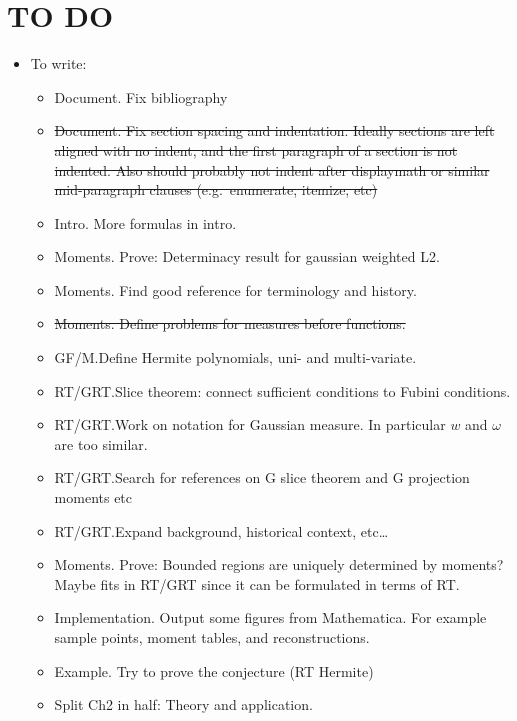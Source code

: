



\section{TO DO}
\begin{itemize}
    \item To write:
    \begin{itemize}
        \item Document. Fix bibliography
        \item \sout{Document. Fix section spacing and indentation. Ideally sections are left aligned with no indent, and the first paragraph of a section is not indented. Also should probably not indent after displaymath or similar mid-paragraph clauses (e.g.\ enumerate, itemize, etc)}
        \item Intro. More formulas in intro.
        \item Moments. Prove: Determinacy result for gaussian weighted L2.
        \item Moments. Find good reference for terminology and history. 
        \item \sout{Moments. Define problems for measures before functions.}
        \item GF/M.\@ Define Hermite polynomials, uni- and multi-variate.
        \item RT/GRT.\@ Slice theorem: connect sufficient conditions to Fubini conditions.
        \item RT/GRT.\@ Work on notation for Gaussian measure. In particular $w$ and $\omega$ are too similar. 
        \item RT/GRT.\@ Search for references on G slice theorem and G projection moments etc
        \item RT/GRT.\@ Expand background, historical context, etc\ldots
        \item Moments. Prove: Bounded regions are uniquely determined by moments? Maybe fits in RT/GRT since it can be formulated in terms of RT.\@
        \item Implementation. Output some figures from Mathematica. For example sample points, moment tables, and reconstructions.
        \item Example. Try to prove the conjecture (RT Hermite)
        \item Split Ch2 in half: Theory and application.
    \end{itemize}


\end{itemize}
